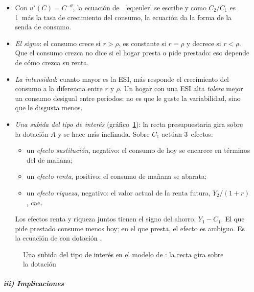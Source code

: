 \documentclass[11pt]{article}
\begin{document}
\begin{itemize}
\item Con $u'(C)=C^{-\theta}$, la ecuación de ~\eqref{eq:euler} se escribe
  y como $C_2/C_1$ es 1~más la tasa de crecimiento del consumo, la ecuación da la forma de la senda de consumo.
\item \emph{El signo}: el consumo crece si $r>\rho$, es constante si $r=\rho$ y decrece si $r<\rho$. Que el consumo crezca no dice si el hogar presta o pide prestado: eso depende de cómo crezca su renta.
\item \emph{La intensidad}: cuanto mayor es la ESI, más responde el crecimiento del consumo a la diferencia entre $r$ y $\rho$. Un hogar con una ESI alta \emph{tolera} mejor un consumo desigual entre periodos: no es que le guste la variabilidad, sino que le disgusta menos.
\item \emph{Una subida del tipo de interés} (gráfico~\ref{fig:fisher-tipo-interes}): la recta presupuestaria gira sobre la dotación $A$ y se hace más inclinada. Sobre $C_1$ actúan 3~efectos:
  \begin{itemize}
  \item un \emph{efecto sustitución}, negativo: el consumo de hoy se encarece en términos del de mañana;
  \item un \emph{efecto renta}, positivo: el consumo de mañana se abarata;
  \item un \emph{efecto riqueza}, negativo: el valor actual de la renta futura, $Y_2/(1+r)$, cae.
  \end{itemize}
  Los efectos renta y riqueza juntos tienen el signo del ahorro, $Y_1-C_1$. El que pide prestado consume menos hoy; en el que presta, el efecto es ambiguo. Es la ecuación de  con dotación .
\end{itemize}

\begin{figure}[H]
\centering
\caption{Una subida del tipo de interés en el modelo de : la recta gira sobre la dotación}\label{fig:fisher-tipo-interes}
\end{figure}

\subparagraph{iii) Implicaciones}
\end{document}
